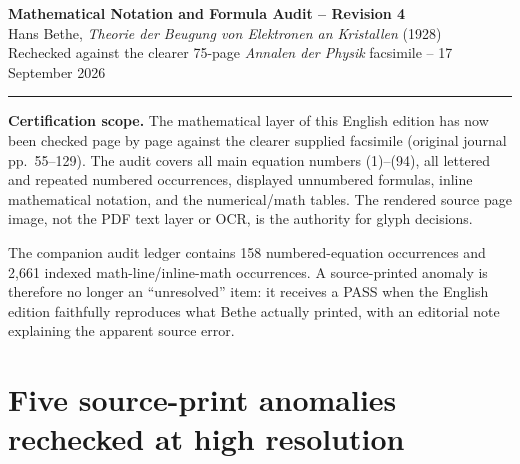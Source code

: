 \documentclass[10pt]{article}
\begin{document}
\begin{center}
{\LARGE\bfseries Mathematical Notation and Formula Audit -- Revision 4}\\[0.35em]
{\large Hans Bethe, \textit{Theorie der Beugung von Elektronen an Kristallen} (1928)}\\[0.3em]
{\small Rechecked against the clearer 75-page \textit{Annalen der Physik} facsimile -- 17 September 2026}
\end{center}
\vspace{0.25em}\hrule\vspace{0.6em}

\textbf{Certification scope.} The mathematical layer of this English edition has now been checked page by page against the clearer supplied facsimile (original journal pp.~55--129). The audit covers all main equation numbers (1)--(94), all lettered and repeated numbered occurrences, displayed unnumbered formulas, inline mathematical notation, and the numerical/math tables. The rendered source page image, not the PDF text layer or OCR, is the authority for glyph decisions.

The companion audit ledger contains 158 numbered-equation occurrences and 2,661 indexed math-line/inline-math occurrences. A source-printed anomaly is therefore no longer an ``unresolved'' item: it receives a PASS when the English edition faithfully reproduces what Bethe actually printed, with an editorial note explaining the apparent source error.

\section{Five source-print anomalies rechecked at high resolution}
\end{document}
